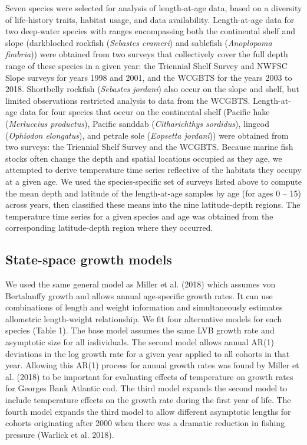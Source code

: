 \documentclass[
]{article}
\begin{document}
Seven species were selected for analysis of length-at-age data, based on
a diversity of life-history traits, habitat usage, and data
availability. Length-at-age data for two deep-water species with ranges
encompassing both the continental shelf and slope (darkbloched rockfish
(\emph{Sebastes crameri}) and sablefish (\emph{Anoplopoma fimbria}))
were obtained from two surveys that collectively cover the full depth
range of these species in a given year: the Triennial Shelf Survey and
NWFSC Slope surveys for years 1998 and 2001, and the WCGBTS for the
years 2003 to 2018. Shortbelly rockfish (\emph{Sebastes jordani}) also
occur on the slope and shelf, but limited observations restricted
analysis to data from the WCGBTS. Length-at-age data for four species
that occur on the continental shelf (Pacific hake (\emph{Merluccius
productus}), Pacific sanddab (\emph{Citharichthys sordidus}), lingcod
(\emph{Ophiodon elongatus}), and petrale sole (\emph{Eopsetta jordani}))
were obtained from two surveys: the Triennial Shelf Survey and the
WCGBTS. Because marine fish stocks often change the depth and spatial
locations occupied as they age, we attempted to derive temperature time
series reflective of the habitats they occupy at a given age. We used
the species-specific set of surveys listed above to compute the mean
depth and latitude of the length-at-age samples by age (for ages 0 --
15) across years, then classified these means into the nine
latitude-depth regions. The temperature time series for a given species
and age was obtained from the corresponding latitude-depth region where
they occurred.

\hypertarget{state-space-growth-models}{%
\subsection{State-space growth models}\label{state-space-growth-models}}

We used the same general model as Miller et al. (2018) which assumes von
Bertalanffy growth and allows annual age-specific growth rates. It can
use combinations of length and weight information and simultaneously
estimates allometric length-weight relationship. We fit four alternative
models for each species (Table 1). The base model assumes the same LVB
growth rate and asymptotic size for all individuals. The second model
allows annual AR(1) deviations in the log growth rate for a given year
applied to all cohorts in that year. Allowing this AR(1) process for
annual growth rates was found by Miller et al. (2018) to be important
for evaluating effects of temperature on growth rates for Georges Bank
Atlantic cod. The third model expands the second model to include
temperature effects on the growth rate during the first year of life.
The fourth model expands the third model to allow different asymptotic
lengths for cohorts originating after 2000 when there was a dramatic
reduction in fishing pressure (Warlick et al. 2018).
\end{document}
